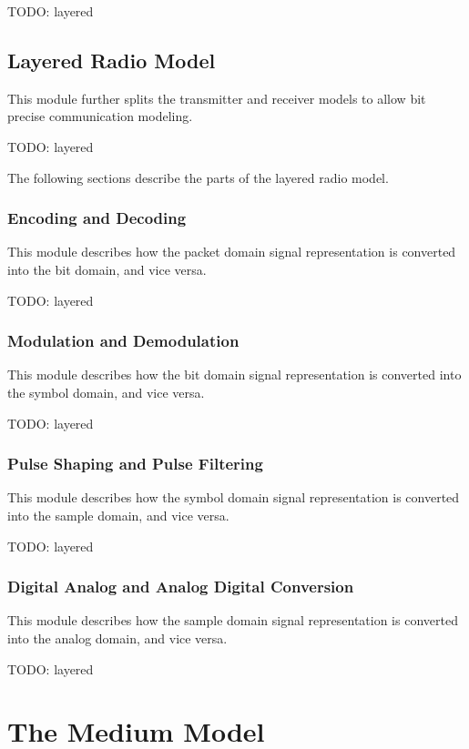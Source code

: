 \ifdraft
TODO: layered
\subsection{Layered Radio Model}

This module further splits the transmitter and receiver models to allow bit
precise communication modeling.

TODO: layered

The following sections describe the parts of the layered radio model.

\subsubsection{Encoding and Decoding}

This module describes how the packet domain signal representation is converted
into the bit domain, and vice versa.

TODO: layered

\subsubsection{Modulation and Demodulation}

This module describes how the bit domain signal representation is converted into
the symbol domain, and vice versa.

TODO: layered

\subsubsection{Pulse Shaping and Pulse Filtering}

This module describes how the symbol domain signal representation is converted
into the sample domain, and vice versa.

TODO: layered


\subsubsection{Digital Analog and Analog Digital Conversion}

This module describes how the sample domain signal representation is converted
into the analog domain, and vice versa.

TODO: layered
\fi

\section{The Medium Model}

